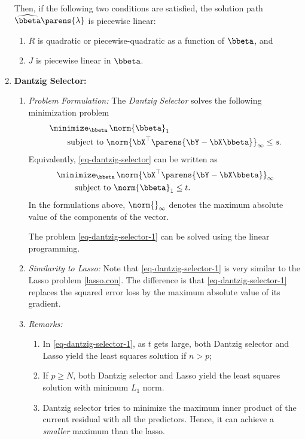 \documentclass[12pt]{article}
\begin{document}
\begin{enumerate}[label=\textbf{\arabic*.}]
	Then, if the following two conditions are satisfied, the solution path $\widehat{\bbeta} \parens{\lambda}$ is piecewise linear: 
	\begin{enumerate}
		\item $R$ is quadratic or piecewise-quadratic as a function of $\bbeta$, and
		\item $J$ is piecewise linear in $\bbeta$. 
	\end{enumerate}
	
	\item \textbf{Dantzig Selector:} 
	\begin{enumerate}
		\item \textit{Problem Formulation:} The \textit{Dantzig Selector} solves the following minimization problem 
		\begin{equation}\label{eq-dantzig-selector}
		\begin{aligned}
			& \, \minimize_{\bbeta} \, \norm{\bbeta}_1 \\ 
			& \qquad \text{ subject to } \norm{\bX^\top \parens{\bY - \bX \bbeta}}_{\infty} \le s. 
		\end{aligned}
		\end{equation}
		Equivalently, \eqref{eq-dantzig-selector} can be written as 
		\begin{equation}\label{eq-dantzig-selector-1}
		\begin{aligned}
			& \, \minimize_{\bbeta} \, \norm{\bX^\top \parens{\bY - \bX \bbeta}}_{\infty} \\ 
			& \qquad \text{ subject to } \norm{\bbeta}_1 \le t. 
		\end{aligned}
		\end{equation}
		In the formulations above, $\norm{}_{\infty}$ denotes the maximum absolute value of the components of the vector. 
		
		The problem \eqref{eq-dantzig-selector-1} can be solved using the linear programming. 
		
		\item \textit{Similarity to Lasso:} Note that \eqref{eq-dantzig-selector-1} is very similar to the Lasso problem \eqref{lasso.con}. The difference is that \eqref{eq-dantzig-selector-1} replaces the squared error loss by the maximum absolute value of its gradient. 
		
		\item \textit{Remarks:}
		\begin{enumerate}
			\item In \eqref{eq-dantzig-selector-1}, as $t$ gets large, both Dantzig selector and Lasso yield the least squares solution if $n > p$; 
			\item If $p \ge N$, both Dantzig selector and Lasso yield the least squares solution with minimum $L_1$ norm. 
			\item Dantzig selector tries to minimize the maximum inner product of the current residual with all the predictors. Hence, it can achieve a \emph{smaller} maximum than the lasso. 
		\end{enumerate}
	\end{enumerate}
	

\end{enumerate}
\end{document}
